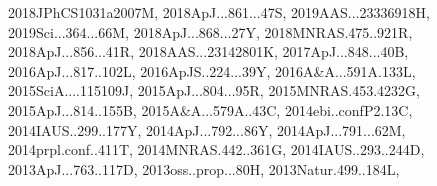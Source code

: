 \documentclass[12pt]{article}
\begin{document}
\begin{enumerate}
\begin{enumerate}
{2018JPhCS1031a2007M,%
2018ApJ...861...47S,%
2019AAS...23336918H,%
2019Sci...364...66M,%
2018ApJ...868...27Y,%
2018MNRAS.475..921R,%
2018ApJ...856...41R,%
2018AAS...23142801K,%
2017ApJ...848...40B,%
2016ApJ...817..102L,%
2016ApJS..224...39Y,%
2016A&A...591A.133L,%
2015SciA....115109J,%
2015ApJ...804...95R,%
2015MNRAS.453.4232G,%
2015ApJ...814..155B,%
2015A&A...579A..43C,%
2014ebi..confP2.13C,%
2014IAUS..299..177Y,%
2014ApJ...792...86Y,%
2014ApJ...791...62M,%
2014prpl.conf..411T,%
2014MNRAS.442..361G,%
2014IAUS..293..244D,%
2013ApJ...763..117D,%
2013oss..prop...80H,%
2013Natur.499..184L,%
}
\end{enumerate}
\end{enumerate}
\end{document}
